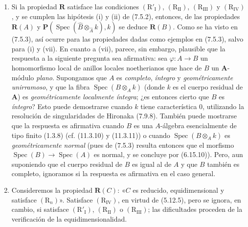 \begin{remarks}[7.5.4]
\begin{enumerate}
\item[(iii)] Si la propiedad $\boldsymbol R$ satisface las
condiciones $(\mathrm R'_{\mathrm I})$, $(\mathrm R_{\mathrm{II}})$,
$(\mathrm R_{\mathrm{III}})$ y $(\mathrm R_{\mathrm{IV}})$, y se
cumplen las hipótesis (i) y (ii) de (7.5.2), entonces, de las
propiedades $\boldsymbol R(A)$ y
$\boldsymbol P(\operatorname{Spec}(\widehat B
\otimes_{\widehat A}k),k)$
se deduce $\boldsymbol R(B)$. Como se ha visto en (7.5.3), así ocurre para
las propiedades dadas como ejemplos en (7.5.3), salvo para (i) y (vii).
En cuanto a (vii), parece, sin embargo, plausible que la respuesta a la
siguiente pregunta sea afirmativa: sea $\varphi:A\to B$ un
homomorfismo local de anillos locales noetherianos que hace de $B$ un
$\mathbf{A}$-módulo \emph{plano}. Supongamos que $A$ es \emph{completo}, \emph{íntegro} y
\emph{geométricamente unirramoso}, y que la fibra
$\operatorname{Spec}(B\otimes_A k)$ (donde $k$ es el cuerpo residual
de $\mathbf{A}$) es \emph{geométricamente localmente íntegra}; ¿es entonces cierto
que $B$ es \emph{íntegro}? Esto puede demostrarse cuando $k$ tiene
característica 0, utilizando la resolución de singularidades de
Hironaka (7.9.8). También puede mostrarse que la respuesta es
afirmativa cuando $B$ es una $A$-álgebra esencialmente de tipo finito
(1.3.8) (cf. (11.3.10) y (11.3.11)) o cuando
$\operatorname{Spec}(B\otimes_A k)$ es \emph{geométricamente normal}
(pues de (7.5.3) resulta entonces que el morfismo
$\operatorname{Spec}(B)\to\operatorname{Spec}(A)$ es normal, y se
concluye por (6.15.10)). Pero, aun suponiendo que el cuerpo residual de
$B$ es igual al de $A$ y que $B$ también es completo, ignoramos si la
respuesta es afirmativa en el caso general.

\item[(iv)] Consideremos la propiedad $\boldsymbol R(C)$:
«$C$ es reducido, equidimensional y satisface $(\mathrm R_n)$».
Satisface $(\mathrm R_{\mathrm{IV}})$, en virtud de (5.12.5), pero
se ignora, en cambio, si satisface $(\mathrm R'_{\mathrm I})$,
$(\mathrm R_{\mathrm{II}})$ o $(\mathrm R_{\mathrm{III}})$; las
dificultades proceden de la verificación de la equidimensionalidad.
\end{enumerate}
\end{remarks}
